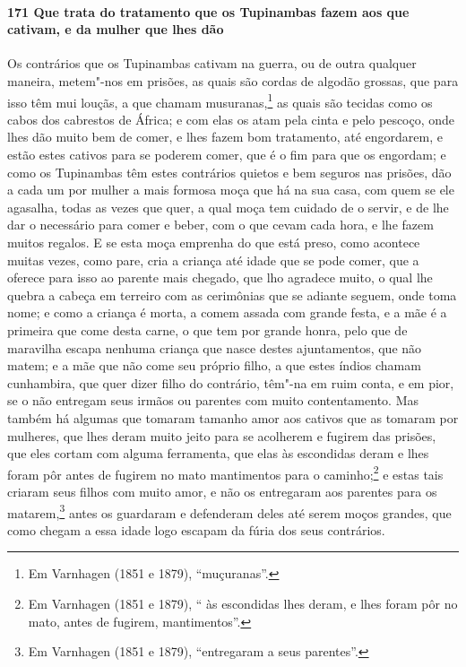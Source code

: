 \begin{linenumbers}
\paragraph{171 Que trata do tratamento que os Tupinambas fazem aos que cativam, e da
mulher que lhes dão}\quad
Os contrários que os Tupinambas cativam na guerra, ou de outra qualquer maneira, metem"-nos
em prisões, as quais são cordas de algodão grossas, que para isso têm mui louçãs, a que
chamam musuranas,\footnote{ Em Varnhagen (1851 e 1879), ``muçuranas''.} as quais são
tecidas como os cabos dos cabrestos de África; e com elas os atam pela cinta e pelo
pescoço, onde lhes dão muito bem de comer, e lhes fazem bom tratamento, até engordarem, e
estão estes cativos para se poderem comer, que é o fim para que os engordam; e como os
Tupinambas têm estes contrários quietos e bem seguros nas prisões, dão a cada um por
mulher a mais formosa moça que há na sua casa, com quem se ele agasalha, todas as vezes
que quer, a qual moça tem cuidado de o servir, e de lhe dar o necessário para comer e
beber, com o que cevam cada hora, e lhe fazem muitos regalos. E se esta moça emprenha do
que está preso, como acontece muitas vezes, como pare, cria a criança até idade que se
pode comer, que a oferece para isso ao parente mais chegado, que lho agradece muito, o
qual lhe quebra a cabeça em terreiro com as cerimônias que se adiante seguem, onde toma
nome; e como a criança é morta, a comem assada com grande festa, e a mãe é a primeira que
come desta carne, o que tem por grande honra, pelo que de maravilha escapa nenhuma criança
que nasce destes ajuntamentos, que não matem; e a mãe que não come seu próprio filho, a
que estes índios chamam cunhambira, que quer dizer filho do contrário, têm"-na em ruim
conta, e em pior, se o não entregam seus irmãos ou parentes com muito contentamento. Mas
também há algumas que tomaram tamanho amor aos cativos que as tomaram por mulheres, que
lhes deram muito jeito para se acolherem e fugirem das prisões, que eles cortam com alguma
ferramenta, que elas às escondidas deram e lhes foram pôr antes de fugirem no mato
mantimentos para o caminho;\footnote{ Em Varnhagen (1851 e 1879), `` às escondidas lhes
deram, e lhes foram pôr no mato, antes de fugirem, mantimentos''.} e estas tais criaram
seus filhos com muito amor, e não os entregaram aos parentes para os matarem,\footnote{ Em
Varnhagen (1851 e 1879), ``entregaram a seus parentes''.} antes os guardaram e defenderam
deles até serem moços grandes, que como chegam a essa idade logo escapam da fúria dos seus
contrários.


\end{linenumbers}
